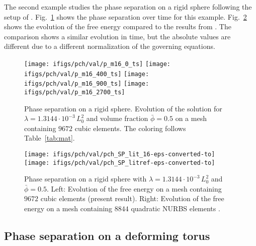\documentclass[11pt]{article}
\begin{document}
The second example studies the phase separation on a rigid sphere following the setup of \citet{bartezzaghi15}. 
Fig.~\ref{fig:sp_evol} shows the phase separation over time for this example. 
Fig.~\ref{fig:sp_lit} shows the evolution of the free energy compared to the results from \citet{bartezzaghi15}. 
The comparison shows a similar evolution in time, but the absolute values are different due to a different normalization of the governing equations. 
\begin{figure}[H]
\centering
\texttt{[image: ifigs/pch/val/p\_m16\_0\_ts]}
\texttt{[image: ifigs/pch/val/p\_m16\_400\_ts]}
\texttt{[image: ifigs/pch/val/p\_m16\_900\_ts]}
\texttt{[image: ifigs/pch/val/p\_m16\_2700\_ts]}
\caption{Phase separation on a rigid sphere. Evolution of the solution for $\lambda=1.3144\cdot10^{-3}\,L_0^2$ and volume fraction $\bar{\phi} = 0.5$ on a mesh containing $9672$ cubic elements. The coloring follows Table~\ref{tab:mat}.}
\label{fig:sp_evol}
\end{figure}
%
\begin{figure}[H]
\centering
\texttt{[image: ifigs/pch/val/pch\_SP\_lit\_16-eps-converted-to]}
\texttt{[image: ifigs/pch/val/pch\_SP\_litref-eps-converted-to]}
\caption{Phase separation on a rigid sphere with $\lambda=1.3144\cdot10^{-3}\,L_0^2$ and $\bar{\phi} = 0.5$. 
Left: Evolution of the free energy on a mesh containing $9672$ cubic elements (present result). 
Right: Evolution of the free energy on a mesh containing $8844$ quadratic NURBS elements \citep{bartezzaghi15}.}
\label{fig:sp_lit}
\end{figure}

\subsection{Phase separation on a deforming torus}\label{s:exT}
\end{document}

